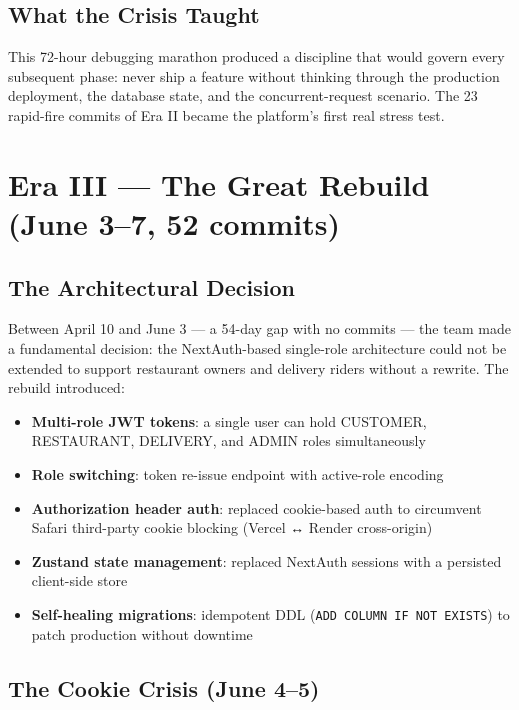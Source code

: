 \documentclass[11pt,a4paper,twoside]{book}
\begin{document}
\subsection{What the Crisis Taught}

\begin{tcolorbox}[story]
This 72-hour debugging marathon produced a discipline that would govern every
subsequent phase: never ship a feature without thinking through the production
deployment, the database state, and the concurrent-request scenario.  The
23 rapid-fire commits of Era II became the platform's first real stress test.
\end{tcolorbox}

\section{Era III — The Great Rebuild (June 3–7, 52 commits)}

\subsection{The Architectural Decision}

Between April 10 and June 3 — a 54-day gap with no commits — the team made a
fundamental decision: the NextAuth-based single-role architecture could not be
extended to support restaurant owners and delivery riders without a rewrite.
The rebuild introduced:

\begin{itemize}[leftmargin=1.4em]
  \item \textbf{Multi-role JWT tokens}: a single user can hold CUSTOMER, RESTAURANT, DELIVERY, and ADMIN roles simultaneously
  \item \textbf{Role switching}: token re-issue endpoint with active-role encoding
  \item \textbf{Authorization header auth}: replaced cookie-based auth to circumvent Safari third-party cookie blocking (Vercel ↔ Render cross-origin)
  \item \textbf{Zustand state management}: replaced NextAuth sessions with a persisted client-side store
  \item \textbf{Self-healing migrations}: idempotent DDL (\texttt{ADD COLUMN IF NOT EXISTS}) to patch production without downtime
\end{itemize}

\subsection{The Cookie Crisis (June 4–5)}
\end{document}
